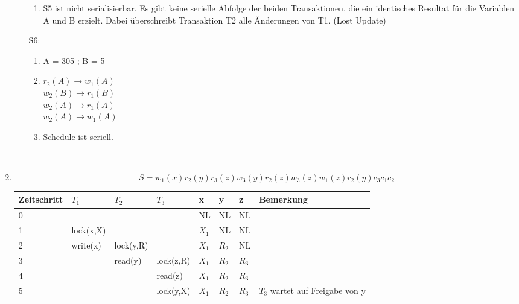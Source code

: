 \documentclass{article}
\begin{document}
\begin{enumerate}
\begin{enumerate}
\begin{enumerate}
                    \item S5 ist nicht serialisierbar. Es gibt keine serielle Abfolge der beiden Transaktionen, die ein identisches
                            Resultat für die Variablen A und B erzielt. Dabei überschreibt Transaktion T2 alle Änderungen von T1. (Lost Update)
                \end{enumerate}
            \item[S6:] 
                \begin{enumerate}
                    \item A = 305 ; B = 5
                    \item   $r_2(A) \longrightarrow w_1(A)$ \\
                            $w_2(B) \longrightarrow r_1(B)$ \\
                            $w_2(A) \longrightarrow r_1(A)$ \\
                            $w_2(A) \longrightarrow w_1(A)$ \\
                    \item Schedule ist seriell.
                \end{enumerate}
        \end{enumerate}
        \newpage
        $ $
        \item
            \[S = w_1(x) r_2(y) r_3(z) w_3(y) r_2(z) w_3(z) w_1(z) r_2(y) c_3 c_1 c_2 \]
            \renewcommand{\arraystretch}{2}
            \begin{tabular}{|p{1.5cm}|p{1.5cm}|p{1.5cm}|p{1.5cm}|p{0.5cm}|p{0.5cm}|p{0.5cm}|p{2.5cm}|}
                \hline
                Zeitschritt & $T_1$       & $T_2$       & $T_3$       & x     & y     & z     & Bemerkung\\ \hline
                0           &             &             &             & NL    & NL    & NL    & \\ \hline
                1           & lock(x,X)   &             &             & $X_1$ & NL    & NL    & \\ \hline
                2           & write(x)    & lock(y,R)   &             & $X_1$ & $R_2$ & NL    & \\ \hline
                3           &             & read(y)     & lock(z,R)   & $X_1$ & $R_2$ & $R_3$ & \\ \hline
                4           &             &             & read(z)     & $X_1$ & $R_2$ & $R_3$ & \\ \hline
                5           &             &             & lock(y,X)   & $X_1$ & $R_2$ & $R_3$ & $T_3$ wartet auf Freigabe von y\\ \hline

\end{tabular}
\end{enumerate}
\end{document}
